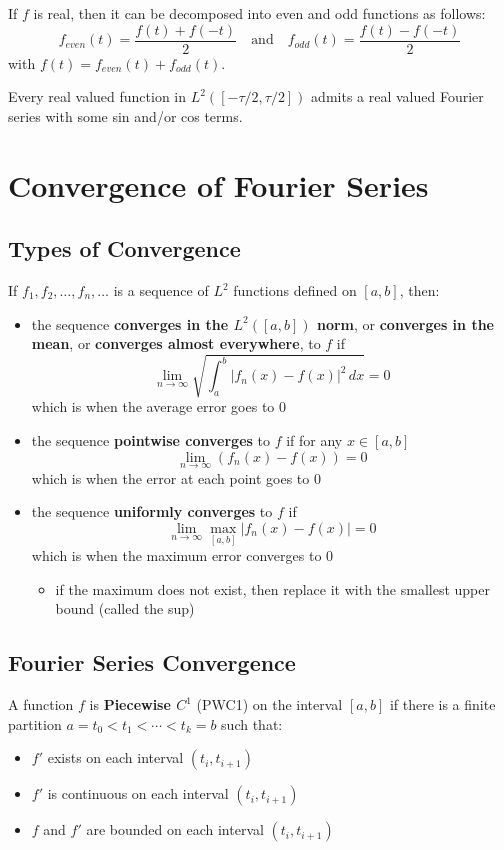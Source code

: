 \documentclass[11pt]{article}
\begin{document}
If \(f\) is real, then it can be decomposed into even and odd functions as follows:
$$
f_{even}(t) = \frac{f(t) + f(-t)}{2} \quad \text{and} \quad
f_{odd}(t) = \frac{f(t) - f(-t)}{2}
$$
with \(f(t) = f_{even}(t) + f_{odd}(t)\).

Every real valued function in \(L^{2}([-\tau/2,\tau/2])\) admits a real valued Fourier series
with some sin and/or cos terms.
\section{Convergence of Fourier Series}
\label{sec:orgad85872}
\subsection{Types of Convergence}
\label{sec:org93958f7}
If \(f_{1}, f_{2}, \dots, f_{n}, \dots\) is a sequence of \(L^{2}\) functions defined on \([a,b]\),
then:
\begin{itemize}
\item the sequence \textbf{converges in the \(L^{2}([a,b])\) norm}, or \textbf{converges in the mean}, or
\textbf{converges almost everywhere}, to \(f\) if
$$
  \lim_{n \to \infty} \sqrt{\int_{a}^{b} |f_{n}(x) - f(x)|^{2} \, dx} = 0
  $$
which is when the average error goes to 0
\item the sequence \textbf{pointwise converges} to \(f\) if for any \(x \in [a,b]\)
$$
  \lim_{n \to \infty} (f_{n}(x) - f(x)) = 0
  $$
which is when the error at each point goes to 0
\item the sequence \textbf{uniformly converges} to \(f\) if
$$
  \lim_{n \to \infty} \max_{[a,b]} |f_{n}(x) - f(x)| = 0
  $$
which is when the maximum error converges to 0
\begin{itemize}
\item if the maximum does not exist, then replace it with the smallest upper bound (called
the sup)
\end{itemize}
\end{itemize}
\subsection{Fourier Series Convergence}
\label{sec:org038cb5d}
A function \(f\) is \textbf{Piecewise \(C^{1}\)} (PWC1) on the interval \([a,b]\) if there is a finite
partition \(a = t_{0} < t_{1} < \cdots < t_{k} = b\) such that:
\begin{itemize}
\item \(f'\) exists on each interval \((t_{i}, t_{i+1})\)
\item \(f'\) is continuous on each interval \((t_{i}, t_{i+1})\)
\item \(f\) and \(f'\) are bounded on each interval \((t_{i}, t_{i+1})\)
\end{itemize}
\end{document}
